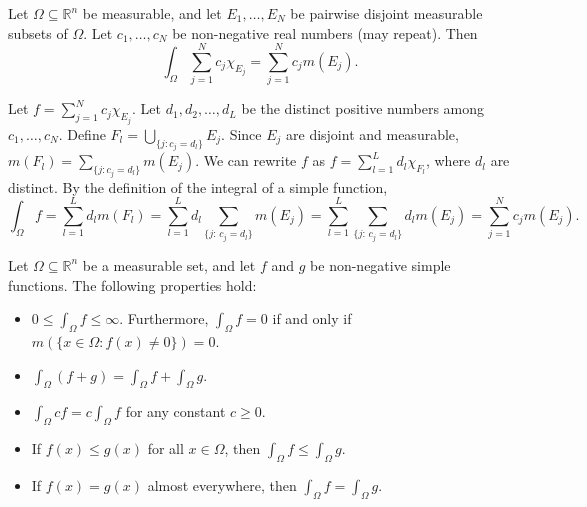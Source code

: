\begin{proposition}
    Let $\Omega \subseteq \mathbb{R}^n$ be measurable, and let $E_1, \dots, E_N$ be pairwise disjoint measurable subsets of $\Omega$. Let $c_1, \dots, c_N$ be non-negative real numbers (may repeat). Then 
    $$\int_\Omega \sum_{j=1}^N c_j \chi_{E_j} = \sum_{j=1}^N c_j m(E_j).$$
\end{proposition}

\begin{pfbox}
    Let $f = \displaystyle\sum_{j=1}^N c_j \chi_{E_j}$. Let $d_1, d_2, \dots, d_L$ be the distinct positive numbers among $c_1, \dots, c_N$. Define $F_l = \displaystyle\bigcup_{\{j: c_j = d_l\}} E_j$. Since $E_j$ are disjoint and measurable, $m(F_l) = \displaystyle\sum_{\{j: c_j = d_l\}} m(E_j)$. 
    We can rewrite $f$ as $f=\displaystyle\sum_{l=1}^L d_l \chi_{F_l}$, where $d_l$ are distinct.
    By the definition of the integral of a simple function, 
    $$\int_\Omega f = \sum_{l=1}^L d_l m(F_l) = \sum_{l=1}^L d_l \sum_{\{j:\, c_j = d_l\}} m(E_j) = \sum_{l=1}^L\sum_{\{j:\, c_j = d_l\}} d_l m(E_j) = \sum_{j=1}^N c_j m(E_j).$$
\end{pfbox}


\begin{theorem}
    Let $\Omega \subseteq \mathbb{R}^n$ be a measurable set, and let $f$ and $g$ be non-negative simple functions. The following properties hold:
    \begin{itemize}
        \item[(a)] $0 \le \int_\Omega f \le \infty$. Furthermore, $\int_\Omega f = 0$ if and only if $m(\{x \in \Omega : f(x) \neq 0\}) = 0$.
        \item[(b)] $\int_\Omega (f+g) = \int_\Omega f + \int_\Omega g$.
        \item[(c)] $\int_\Omega cf = c \int_\Omega f$ for any constant $c \ge 0$.
        \item[(d)] If $f(x) \le g(x)$ for all $x \in \Omega$, then $\int_\Omega f \le \int_\Omega g$.
        \item[(e)] If $f(x) = g(x)$ almost everywhere, then $\int_\Omega f = \int_\Omega g$.
    \end{itemize}
\end{theorem}

